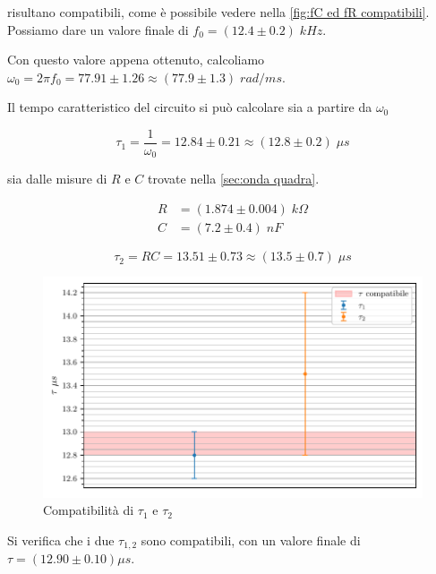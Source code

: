 \documentclass[11pt, a4paper]{article}
\numberwithin{equation}{section} %
\begin{document}
risultano compatibili, come è possibile vedere nella \autoref{fig:fC ed fR compatibili}. Possiamo dare un valore finale di $f_{0} = (12.4 \pm 0.2) \; kHz$.

Con questo valore appena ottenuto, calcoliamo $\omega_{0} = 2 \pi f_{0} = 77.91 \pm 1.26 \approx (77.9 \pm 1.3) \; rad/ms$.

Il tempo caratteristico del circuito si può calcolare sia a partire da $\omega_{0}$

\begin{equation*}
    \tau_{1} = \frac{1}{\omega_{0}} = 12.84 \pm 0.21 \approx (12.8 \pm 0.2) \; \mu s
\end{equation*}

sia dalle misure di $R$ e $C$ trovate nella \autoref{sec:onda quadra}.

\begin{align*}
    R &= (1.874 \pm 0.004) \; \unit{k\Omega} \\
    C &= (7.2 \pm 0.4) \; \unit{nF}
\end{align*}

\begin{equation*}
    \tau_{2} = RC = 13.51 \pm 0.73 \approx (13.5 \pm 0.7) \; \mu s
\end{equation*}

\begin{figure}[ht!]
    \includegraphics{tau_compatibili.pdf}
    \caption{Compatibilità di $\tau_{1}$ e $\tau_{2}$}
    \label{fig:tau compatibili}
\end{figure}
 
Si verifica che i due $\tau_{1,2}$ sono compatibili, con un valore finale di $\tau = (12.90 \pm 0.10) \mu s$.

\end{document}
